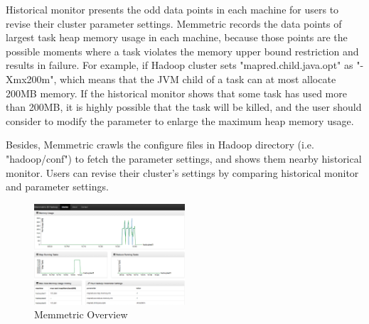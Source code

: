 Historical monitor presents the odd data points in each machine for users to revise their cluster parameter settings. Memmetric records the data points of largest task heap memory usage in each machine, because those points are the possible moments where a task violates the memory upper bound restriction and results in failure. For example, if Hadoop cluster sets "mapred.child.java.opt" as "-Xmx200m", which means that  the JVM child of a task can at most allocate 200MB memory. If the historical monitor shows that some task has used more than 200MB, it is highly possible that the task will be killed, and the user should consider to modify the parameter to enlarge the maximum heap memory usage.

Besides, Memmetric crawls the configure files in Hadoop directory (i.e. "hadoop/conf") to fetch the parameter settings, and shows them nearby historical monitor. Users can revise their cluster's settings by comparing historical monitor and parameter settings. 

\begin{figure}[h!]
  \centering
    \includegraphics[width=0.5\textwidth]{image/overview.png}
  \caption{Memmetric Overview}
\end{figure}

